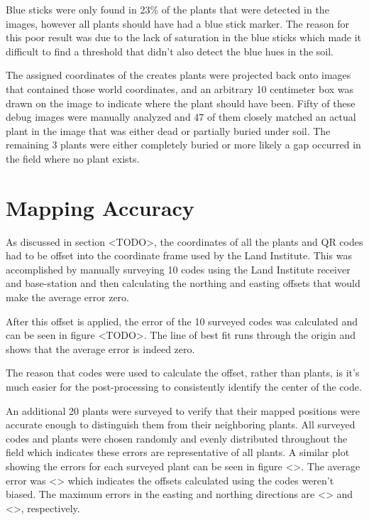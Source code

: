 Blue sticks were only found in 23\% of the plants that were detected in the images, however all plants should have had a blue stick marker.  The reason for this poor result was due to the lack of saturation in the blue sticks which made it difficult to find a threshold that didn't also detect the blue hues in the soil.  


The assigned coordinates of the creates plants were projected back onto images that contained those world coordinates, and an arbitrary 10 centimeter box was drawn on the image to indicate where the plant should have been.  Fifty of these debug images were manually analyzed and 47 of them closely matched an actual plant in the image that was either dead or partially buried under soil.  The remaining 3 plants were either completely buried or more likely a gap occurred in the field where no plant exists.  

\section{Mapping Accuracy}

As discussed in section <TODO>, the coordinates of all the plants and QR codes had to be offset into the coordinate frame used by the Land Institute.  This was accomplished by manually surveying 10 codes using the Land Institute receiver and base-station and then calculating the northing and easting offsets that would make the average error zero.  

After this offset is applied, the error of the 10 surveyed codes was calculated and can be seen in figure <TODO>.  The line of best fit runs through the origin and shows that the average error is indeed zero.    


The reason that codes were used to calculate the offset, rather than plants, is it's much easier for the post-processing to consistently identify the center of the code. 

An additional 20 plants were surveyed to verify that their mapped positions were accurate enough to distinguish them from their neighboring plants.  All surveyed codes and plants were chosen randomly and evenly distributed throughout the field which indicates these errors are representative of all plants.   A similar plot showing the errors for each surveyed plant can be seen in figure <>.  The average error was <> which indicates the offsets calculated using the codes weren't biased.  The maximum errors in the easting and northing directions are <> and <>, respectively.  

